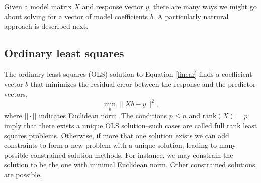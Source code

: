 \documentclass[10pt]{article} %
\begin{document}
Given a model matrix $X$ and response vector $y$, there are many ways we might
go about solving for a vector of model coefficients $b$. A particularly
natrural approach is described next.


\subsection*{Ordinary least squares}

The ordinary least squares (OLS) solution to Equation \ref{linear} 
finds a coefficient vector $b$ that
minimizes the residual error between the response and the predictor
vectors,
\[
\min_b \|X b - y\|^2,
\]
where $||\cdot||$ indicates Euclidean norm.  The conditions $p \le n$ and
$\mathrm{rank}(X)=p$ imply that there exists a unique OLS solution--such cases
are called full rank least squares problems.  Otherwise, if more that one
solution exists we can add constraints to form a new problem with a unique
solution, leading to many possible constrained solution methods.
For instance, we may constrain the solution to be the one with minimal
Euclidean norm. Other constrained solutions are possible.
\end{document}
